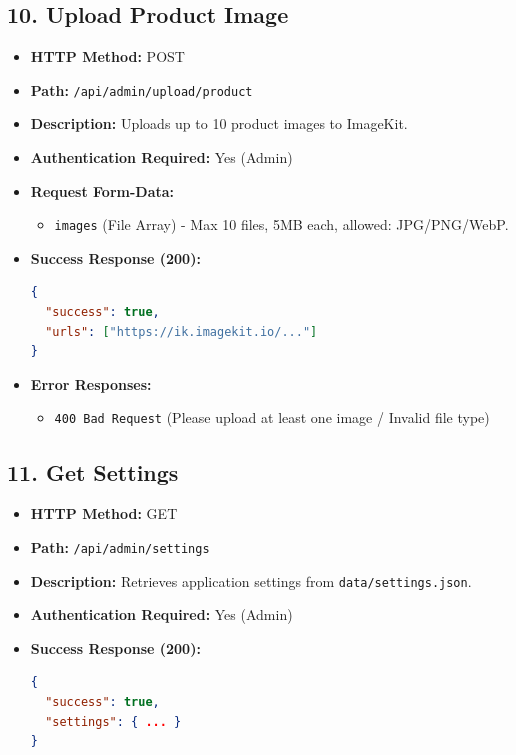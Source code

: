\documentclass[12pt,a4paper]{article}
\begin{document}
\subsection{10. Upload Product Image}
\begin{itemize}
    \item \textbf{HTTP Method:} POST
    \item \textbf{Path:} \texttt{/api/admin/upload/product}
    \item \textbf{Description:} Uploads up to 10 product images to ImageKit.
    \item \textbf{Authentication Required:} Yes (Admin)
    \item \textbf{Request Form-Data:}
    \begin{itemize}
        \item \texttt{images} (File Array) - Max 10 files, 5MB each, allowed: JPG/PNG/WebP.
    \end{itemize}
    \item \textbf{Success Response (200):}
\begin{lstlisting}[language=json]
{
  "success": true,
  "urls": ["https://ik.imagekit.io/..."]
}
\end{lstlisting}
    \item \textbf{Error Responses:}
    \begin{itemize}
        \item \texttt{400 Bad Request} (Please upload at least one image / Invalid file type)
    \end{itemize}
\end{itemize}

\subsection{11. Get Settings}
\begin{itemize}
    \item \textbf{HTTP Method:} GET
    \item \textbf{Path:} \texttt{/api/admin/settings}
    \item \textbf{Description:} Retrieves application settings from \texttt{data/settings.json}.
    \item \textbf{Authentication Required:} Yes (Admin)
    \item \textbf{Success Response (200):}
\begin{lstlisting}[language=json]
{
  "success": true,
  "settings": { ... }
}
\end{lstlisting}
\end{itemize}
\end{document}

